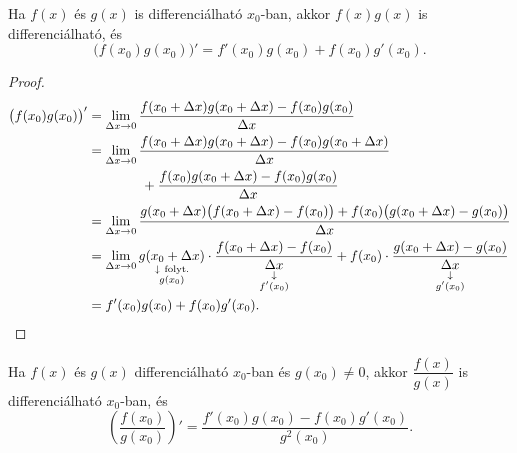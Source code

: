\documentclass[11pt]{article}
\begin{document}
\begin{thmbox}
\begin{theorem}[Szorzat]
Ha $f(x)$ és $g(x)$ is differenciálható $x_{0}$-ban, akkor $f(x)g(x)$ is differenciálható, és
\[
\bigl(f(x_{0})g(x_{0})\bigr)'=f'(x_{0})g(x_{0})+f(x_{0})g'(x_{0}).
\]
\end{theorem}
\end{thmbox}
\begin{proof}
\begin{align*}
\bigl(f(x_{0})g(x_{0})\bigr)'&=\lim_{\Delta x\to 0}\frac{f(x_{0}+\Delta x)g(x_{0}+\Delta x)-f(x_{0})g(x_{0})}{\Delta x}\\
&=\lim_{\Delta x\to 0}\frac{f(x_{0}+\Delta x)g(x_{0}+\Delta x)-f(x_{0})g(x_{0}+\Delta x)}{\Delta x}\\
&\qquad\qquad+\frac{f(x_{0})g(x_{0}+\Delta x)-f(x_{0})g(x_{0})}{\Delta x}\\
&=\lim_{\Delta x\to 0}\frac{g(x_{0}+\Delta x)\bigl(f(x_{0}+\Delta x)-f(x_{0})\bigr)+f(x_{0})\bigl(g(x_{0}+\Delta x)-g(x_{0})\bigr)}{\Delta x}\\
&=\lim_{\Delta x\to 0}\underset{\substack{\downarrow\ \text{folyt.}\\ g(x_{0})}}{g(x_{0}+\Delta x)}\cdot
\underset{\substack{\downarrow\\ f'(x_{0})}}{\frac{f(x_{0}+\Delta x)-f(x_{0})}{\Delta x}}
+f(x_{0})\cdot\underset{\substack{\downarrow\\ g'(x_{0})}}{\frac{g(x_{0}+\Delta x)-g(x_{0})}{\Delta x}}\\
&=f'(x_{0})g(x_{0})+f(x_{0})g'(x_{0}). \qedhere
\end{align*}
\end{proof}

\begin{thmbox}
\begin{theorem}[Hányados]
Ha $f(x)$ és $g(x)$ differenciálható $x_{0}$-ban és $g(x_{0})\neq 0$, akkor $\dfrac{f(x)}{g(x)}$ is differenciálható $x_{0}$-ban, és
\[
\left(\frac{f(x_{0})}{g(x_{0})}\right)'=\frac{f'(x_{0})g(x_{0})-f(x_{0})g'(x_{0})}{g^{2}(x_{0})}.
\]
\end{theorem}
\end{thmbox}
\noproof
\end{document}
